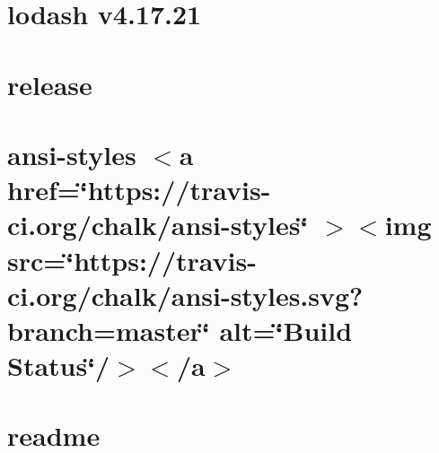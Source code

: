 \documentclass[twoside]{book}
\newcommand{\+}{\discretionary{\mbox{\scriptsize$\hookleftarrow$}}{}{}}
\begin{document}
\chapter{lodash v4.17.21}
\label{md__c___users_vaishnavi_jadhav__desktop__developer_code_mean_stack_example_client_node_modules_lodash__r_e_a_d_m_e}

\chapter{release}
\label{md__c___users_vaishnavi_jadhav__desktop__developer_code_mean_stack_example_client_node_modules_lodash_release}

\chapter{ansi-\/styles \texorpdfstring{$<$}{<}a href=\char`\"{}https\+://travis-\/ci.\+org/chalk/ansi-\/styles\char`\"{} \texorpdfstring{$>$}{>}\texorpdfstring{$<$}{<}img src=\char`\"{}https\+://travis-\/ci.\+org/chalk/ansi-\/styles.\+svg?branch=master\char`\"{} alt=\char`\"{}\+Build Status\char`\"{}/\texorpdfstring{$>$}{>}\texorpdfstring{$<$}{<}/a\texorpdfstring{$>$}{>}}
\label{md__c___users_vaishnavi_jadhav__desktop__developer_code_mean_stack_example_client_node_modules_lbe172074de018b5227ec01057f5a7fd8}

\chapter{readme}
\label{md__c___users_vaishnavi_jadhav__desktop__developer_code_mean_stack_example_client_node_modules_l748108e3800ca18842c259836a46850f}

\end{document}
